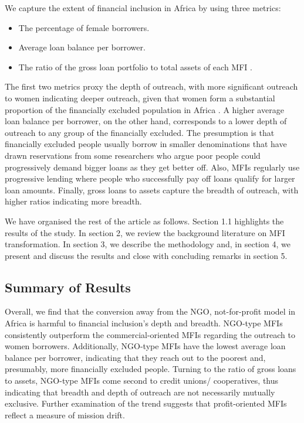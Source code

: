 \documentclass[a4paper, nobind]{templates/ociamthesis}
\providecommand{\tightlist}{%
  \setlength{\itemsep}{0pt}\setlength{\parskip}{0pt}}
\begin{document}
We capture the extent of financial inclusion in Africa by using three metrics:

\begin{itemize}
\tightlist
\item
  The percentage of female borrowers.
\item
  Average loan balance per borrower.
\item
  The ratio of the gross loan portfolio to total assets of each MFI \autocite{d2017ngos}.
\end{itemize}

The first two metrics proxy the depth of outreach, with more significant outreach to women indicating deeper outreach, given that women form a substantial proportion of the financially excluded population in Africa \autocite{ayyagari2013financing}. A higher average loan balance per borrower, on the other hand, corresponds to a lower depth of outreach to any group of the financially excluded. The presumption is that financially excluded people usually borrow in smaller denominations that have drawn reservations from some researchers who argue poor people could progressively demand bigger loans as they get better off. Also, MFIs regularly use progressive lending where people who successfully pay off loans qualify for larger loan amounts. Finally, gross loans to assets capture the breadth of outreach, with higher ratios indicating more breadth.

We have organised the rest of the article as follows. Section 1.1 highlights the results of the study. In section 2, we review the background literature on MFI transformation. In section 3, we describe the methodology and, in section 4, we present and discuss the results and close with concluding remarks in section 5.

\hypertarget{summary-of-results-1}{%
\subsection{Summary of Results}\label{summary-of-results-1}}

Overall, we find that the conversion away from the NGO, not-for-profit model in Africa is harmful to financial inclusion's depth and breadth. NGO-type MFIs consistently outperform the commercial-oriented MFIs regarding the outreach to women borrowers. Additionally, NGO-type MFIs have the lowest average loan balance per borrower, indicating that they reach out to the poorest and, presumably, more financially excluded people. Turning to the ratio of gross loans to assets, NGO-type MFIs come second to credit unions/ cooperatives, thus indicating that breadth and depth of outreach are not necessarily mutually exclusive. Further examination of the trend suggests that profit-oriented MFIs reflect a measure of mission drift.
\end{document}
